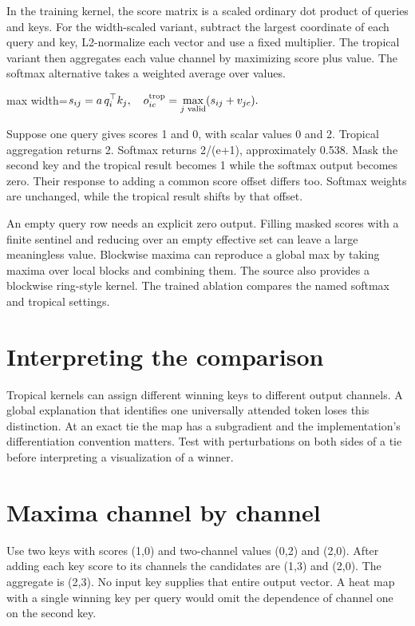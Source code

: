 \documentclass[11pt,oneside,openany]{book}
\begin{document}
In the training kernel, the score matrix is a scaled ordinary dot product of queries and keys. For the width-scaled variant, subtract the largest coordinate of each query and key, L2-normalize each vector and use a fixed multiplier. The tropical variant then aggregates each value channel by maximizing score plus value. The softmax alternative takes a weighted average over values.

\begin{center}\begin{adjustbox}{max width=\linewidth}$\displaystyle s_{ij}=a\,q_i^\top k_j,\quad o_{ic}^{\rm trop}=\max_{j\text{ valid}}(s_{ij}+v_{jc}).$\end{adjustbox}\end{center}
Suppose one query gives scores 1 and 0, with scalar values 0 and 2. Tropical aggregation returns 2. Softmax returns 2/(e+1), approximately 0.538. Mask the second key and the tropical result becomes 1 while the softmax output becomes zero. Their response to adding a common score offset differs too. Softmax weights are unchanged, while the tropical result shifts by that offset.

An empty query row needs an explicit zero output. Filling masked scores with a finite sentinel and reducing over an empty effective set can leave a large meaningless value. Blockwise maxima can reproduce a global max by taking maxima over local blocks and combining them. The source also provides a blockwise ring-style kernel. The trained ablation compares the named softmax and tropical settings.

\section*{Interpreting the comparison}
Tropical kernels can assign different winning keys to different output channels. A global explanation that identifies one universally attended token loses this distinction. At an exact tie the map has a subgradient and the implementation's differentiation convention matters. Test with perturbations on both sides of a tie before interpreting a visualization of a winner.

\section*{Maxima channel by channel}
Use two keys with scores (1,0) and two-channel values (0,2) and (2,0). After adding each key score to its channels the candidates are (1,3) and (2,0). The aggregate is (2,3). No input key supplies that entire output vector. A heat map with a single winning key per query would omit the dependence of channel one on the second key.
\end{document}
